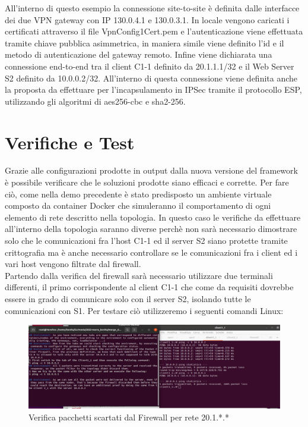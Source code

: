 All'interno di questo esempio la connessione site-to-site è definita dalle interfacce dei due VPN gateway con IP 130.0.4.1 e 130.0.3.1. In locale vengono caricati i certificati attraverso
il file VpnConfig1Cert.pem e l'autenticazione viene effettuata tramite chiave pubblica asimmetrica, in maniera simile viene definito l'id e il metodo di autenticazione del gateway remoto.
Infine viene dichiarata una connessione end-to-end tra il client C1-1 definito da 20.1.1.1/32 e il Web Server S2 definito da 10.0.0.2/32. All'interno di questa connessione viene definita anche la proposta
da effettuare per l'incapsulamento in IPSec tramite il protocollo ESP, utilizzando gli algoritmi di aes256-cbc e sha2-256.

\section{Verifiche e Test}

Grazie alle configurazioni prodotte in output dalla nuova versione del framework è possibile verificare che le soluzioni prodotte siano efficaci e corrette.
Per fare ciò, come nella demo precedente è stato predisposto un ambiente virtuale composto da container Docker che simuleranno il comportamento di ogni elemento di rete descritto nella topologia. In questo caso
le verifiche da effettuare all'interno della topologia saranno diverse perchè non sarà necessario dimostrare solo che le comunicazioni fra l'host C1-1 ed il server S2 siano protette tramite crittografia ma è anche
necessario controllare se le comunicazioni fra i client ed i vari host vengono filtrate dal firewall. \\
Partendo dalla verifica del firewall sarà necessario utilizzare due terminali differenti, il primo corrispondente al client C1-1 che come da requisiti dovrebbe essere in grado di comunicare solo con il server S2, isolando tutte le
comunicazioni con S1. Per testare ciò utilizzeremo i seguenti comandi Linux:

\begin{figure}[H] 
    \centering
    \includegraphics[width=1\textwidth]{(1)FirewallDiscard1.png} 
    \caption{Verifica pacchetti scartati dal Firewall per rete 20.1.*.*}
    \label{fig:Verifica1}
\end{figure}

